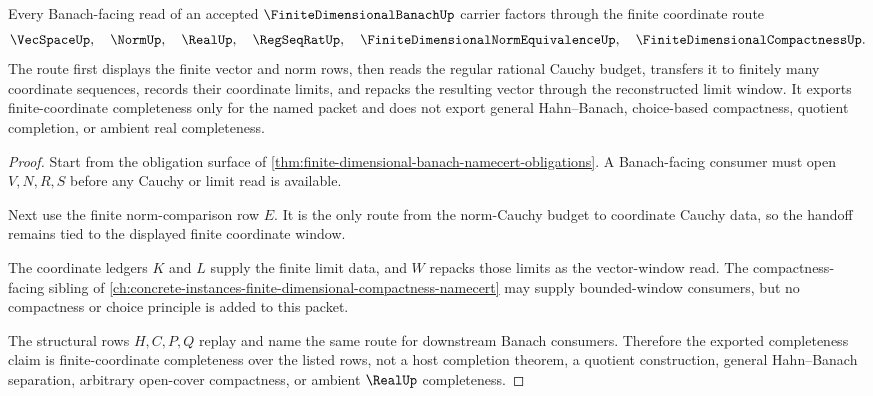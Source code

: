 \begin{theorem}
\label{thm:finite-dimensional-banach-coordinate-completeness-handoff}
Every Banach-facing read of an accepted $\FiniteDimensionalBanachUp$ carrier factors through the finite coordinate route
$$
\VecSpaceUp,\quad \NormUp,\quad \RealUp,\quad \RegSeqRatUp,\quad \FiniteDimensionalNormEquivalenceUp,\quad \FiniteDimensionalCompactnessUp .
$$
The route first displays the finite vector and norm rows, then reads the regular rational Cauchy budget, transfers it to finitely many coordinate sequences, records their coordinate limits, and repacks the resulting vector through the reconstructed limit window. It exports finite-coordinate completeness only for the named packet and does not export general Hahn--Banach, choice-based compactness, quotient completion, or ambient real completeness.
\end{theorem}
\begin{proof}
Start from the obligation surface of \autoref{thm:finite-dimensional-banach-namecert-obligations}. A Banach-facing consumer must open $V,N,R,S$ before any Cauchy or limit read is available.

Next use the finite norm-comparison row $E$. It is the only route from the norm-Cauchy budget to coordinate Cauchy data, so the handoff remains tied to the displayed finite coordinate window.

The coordinate ledgers $K$ and $L$ supply the finite limit data, and $W$ repacks those limits as the vector-window read. The compactness-facing sibling of \autoref{ch:concrete-instances-finite-dimensional-compactness-namecert} may supply bounded-window consumers, but no compactness or choice principle is added to this packet.

The structural rows $H,C,P,Q$ replay and name the same route for downstream Banach consumers. Therefore the exported completeness claim is finite-coordinate completeness over the listed rows, not a host completion theorem, a quotient construction, general Hahn--Banach separation, arbitrary open-cover compactness, or ambient $\RealUp$ completeness.
\end{proof}


